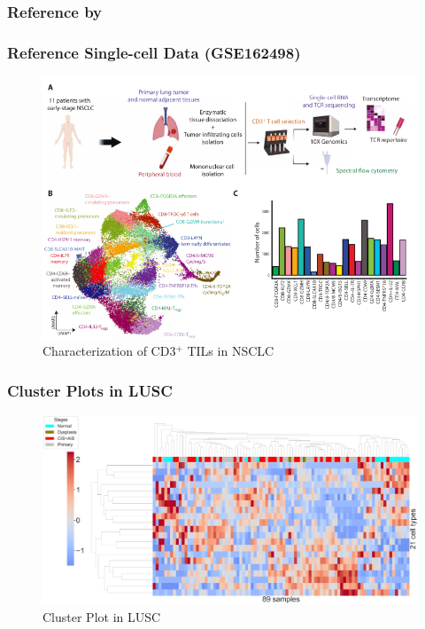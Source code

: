 \documentclass{beamer}
\begin{document}
    \subsubsection{Reference by \protect{}}
    \begin{frame}
        \frametitle{Reference Single-cell Data (GSE162498)}

        \begin{figure}
            \includegraphics[width=0.8 \linewidth]{figures/LungCancer/reference_2.png}
            \caption{Characterization of CD3$^+$ TILs in NSCLC \protect\cite{singlecell2}}
        \end{figure}
    \end{frame}

    \begin{frame}
        \frametitle{Cluster Plots in LUSC}

        \begin{figure}
            \includegraphics[width=0.9 \linewidth]{figures/BisqueRNA/clustermap/STAR.FPKM.GSE162498.SQC.pdf}
            \caption{Cluster Plot in LUSC}
        \end{figure}
    \end{frame}
\end{document}

